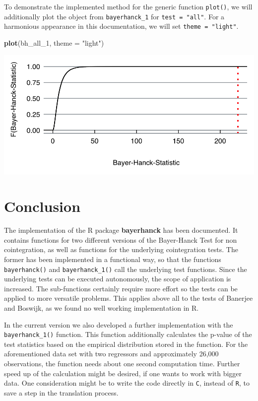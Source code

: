 \documentclass[11pt,a4paper]{article}
\let\origfigure\figure
\let\endorigfigure\endfigure
\renewenvironment{figure}[1][2] {
    \expandafter\origfigure\expandafter[H]
} {
    \endorigfigure
}
\newenvironment{Shaded}{\begin{snugshade}}{\end{snugshade}}
\newcommand{\DataTypeTok}[1]{\textcolor[rgb]{0.13,0.29,0.53}{#1}}
\newcommand{\DecValTok}[1]{\textcolor[rgb]{0.00,0.00,0.81}{#1}}
\newcommand{\KeywordTok}[1]{\textcolor[rgb]{0.13,0.29,0.53}{\textbf{#1}}}
\newcommand{\NormalTok}[1]{#1}
\newcommand{\StringTok}[1]{\textcolor[rgb]{0.31,0.60,0.02}{#1}}
\begin{document}
To demonstrate the implemented method for the generic function
\texttt{plot()}, we will additionally plot the object from
\texttt{bayerhanck\_1} for \texttt{test\ =\ "all"}. For a harmonious
appearance in this documentation, we will set
\texttt{theme\ =\ "light"}.

\begin{Shaded}
\begin{Highlighting}[]
\KeywordTok{plot}\NormalTok{(bh_all_}\DecValTok{1}\NormalTok{, }\DataTypeTok{theme =} \StringTok{"light"}\NormalTok{)}
\end{Highlighting}
\end{Shaded}

\begin{figure}
\centering
\includegraphics{plot_bh.png}
\caption{Cumulative Distribution Function under \(\mathcal{H}_0\)}
\end{figure}

\hypertarget{conclusion}{%
\section{Conclusion}\label{conclusion}}

The implementation of the R package \textbf{bayerhanck} has been
documented. It contains functions for two different versions of the
Bayer-Hanck Test for non cointegration, as well as functions for the
underlying cointegration tests. The former has been implemented in a
functional way, so that the functions \texttt{bayerhanck()} and
\texttt{bayerhanck\_1()} call the underlying test functions. Since the
underlying tests can be executed autonomously, the scope of application
is increased. The sub-functions certainly require more effort so the
tests can be applied to more versatile problems. This applies above all
to the tests of Banerjee and Boswijk, as we found no well working
implementation in R.

In the current version we also developed a further implementation with
the \texttt{bayerhanck\_1()} function. This function additionally
calculates the p-value of the test statistics based on the empirical
distribution stored in the function. For the aforementioned data set
with two regressors and approximately 26,000 observations, the function
needs about one second computation time. Further speed up of the
calculation might be desired, if one wants to work with bigger data. One
consideration might be to write the code directly in \texttt{C}, instead
of \texttt{R}, to save a step in the translation process.
\end{document}
